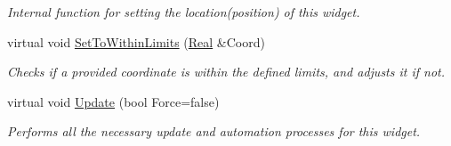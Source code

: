 \begin{DoxyCompactItemize}
\begin{DoxyCompactList}\small\item\em Internal function for setting the location(position) of this widget. \item\end{DoxyCompactList}\item 
\hypertarget{classphys_1_1UI_1_1Scrollbar_a2048345c29ba15b8820971492f2bdea1}{
virtual void \hyperlink{classphys_1_1UI_1_1Scrollbar_a2048345c29ba15b8820971492f2bdea1}{SetToWithinLimits} (\hyperlink{namespacephys_af7eb897198d265b8e868f45240230d5f}{Real} \&Coord)}
\label{classphys_1_1UI_1_1Scrollbar_a2048345c29ba15b8820971492f2bdea1}

\begin{DoxyCompactList}\small\item\em Checks if a provided coordinate is within the defined limits, and adjusts it if not. \item\end{DoxyCompactList}\item 
\hypertarget{classphys_1_1UI_1_1Scrollbar_a628999b4caa32f3c273d45e64d5c62a0}{
virtual void \hyperlink{classphys_1_1UI_1_1Scrollbar_a628999b4caa32f3c273d45e64d5c62a0}{Update} (bool Force=false)}
\label{classphys_1_1UI_1_1Scrollbar_a628999b4caa32f3c273d45e64d5c62a0}

\begin{DoxyCompactList}\small\item\em Performs all the necessary update and automation processes for this widget. \item\end{DoxyCompactList}\end{DoxyCompactItemize}
